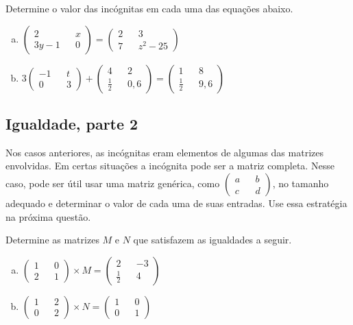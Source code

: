 \documentclass[main_estudante.tex]{subfiles}
\begin{document}
\begin{questao}
Determine o valor das incógnitas em cada uma das equações abaixo.
\begin{enumerate}[a)]
\item $\begin{pmatrix} 2 && x \\ 3y-1 && 0 \end{pmatrix} = \begin{pmatrix} 2 && 3 \\ 7 && z^2-25 \end{pmatrix}$
\item $ 3 \begin{pmatrix} -1 && t \\ 0 && 3 \end{pmatrix} + \begin{pmatrix} 4 && 2 \\ \frac{1}{2} && 0,6 \end{pmatrix} = \begin{pmatrix} 1 && 8 \\ \frac{1}{2} && 9,6 \end{pmatrix} $
\end{enumerate}
\end{questao}

\subsection*{Igualdade, parte 2}

Nos casos anteriores, as incógnitas eram elementos de algumas das matrizes envolvidas. Em certas situações a incógnita pode ser a matriz completa. Nesse caso, pode ser útil usar uma matriz genérica, como $\begin{pmatrix} a && b \\ c && d \end{pmatrix}$, no tamanho adequado e determinar o valor de cada uma de suas entradas. Use essa estratégia na próxima questão.

\begin{questao}
Determine as matrizes $M$ e $N$ que satisfazem as igualdades a seguir.
\begin{enumerate}[a)]
\item $ \begin{pmatrix} 1 && 0 \\ 2 && 1 \end{pmatrix} \times M = \begin{pmatrix} 2 && -3 \\ \frac{1}{2} && 4 \end{pmatrix} $
\item $ \begin{pmatrix} 1 && 2 \\ 0 && 2 \end{pmatrix} \times N = \begin{pmatrix} 1 && 0 \\ 0 && 1 \end{pmatrix} $ 
\end{enumerate}
\end{questao}
\end{document}
